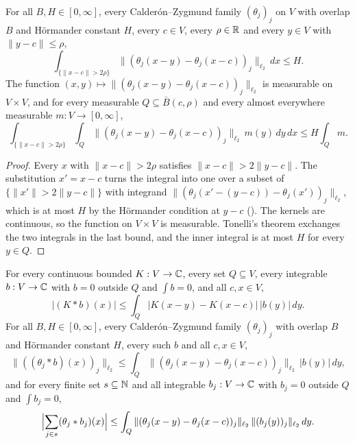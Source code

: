 \begin{lemma}
\label{lem:hormander-around-cube}
\leanok
{}
For all $B, H \in [0, \infty]$, every Calder\'on--Zygmund family $(\theta_j)_j$ on $V$ with
overlap $B$ and H\"ormander constant $H$, every $c \in V$, every $\rho \in \mathbb{R}$ and every
$y \in V$ with $\|y - c\| \leq \rho$,
\[
  \int_{\{\|x - c\| > 2\rho\}} \|(\theta_j(x - y) - \theta_j(x - c))_j\|_{\ell_2} \, dx \leq H .
\]
The function $(x, y) \mapsto \|(\theta_j(x - y) - \theta_j(x - c))_j\|_{\ell_2}$ is measurable
on $V \times V$, and for every measurable $Q \subseteq \bar B(c, \rho)$ and every almost
everywhere measurable $m : V \to [0, \infty]$,
\[
  \int_{\{\|x - c\| > 2\rho\}} \int_Q \|(\theta_j(x - y) - \theta_j(x - c))_j\|_{\ell_2} \,
  m(y) \, dy \, dx \leq H \int_Q m .
\]
\end{lemma}

\begin{proof}
\leanok
Every $x$ with $\|x - c\| > 2\rho$ satisfies $\|x - c\| > 2 \|y - c\|$. The substitution
$x' = x - c$ turns the integral into one over a subset of $\{\|x'\| > 2 \|y - c\|\}$ with
integrand $\|(\theta_j(x' - (y - c)) - \theta_j(x'))_j\|_{\ell_2}$, which is at most $H$ by the
H\"ormander condition at $y - c$ (). The kernels are continuous, so the
function on $V \times V$ is measurable. Tonelli's theorem exchanges the two integrals in the
last bound, and the inner integral is at most $H$ for every $y \in Q$.
\end{proof}

\begin{lemma}
\label{lem:mean-zero-pieces-conv}
\leanok
{}
For every continuous bounded $K : V \to \mathbb{C}$, every set $Q \subseteq V$, every integrable
$b : V \to \mathbb{C}$ with $b = 0$ outside $Q$ and $\int b = 0$, and all $c, x \in V$,
\[
  |(K * b)(x)| \leq \int_Q |K(x - y) - K(x - c)| \, |b(y)| \, dy .
\]
For all $B, H \in [0, \infty]$, every Calder\'on--Zygmund family $(\theta_j)_j$ with overlap
$B$ and H\"ormander constant $H$, every such $b$ and all $c, x \in V$,
\[
  \|((\theta_j * b)(x))_j\|_{\ell_2}
  \leq \int_Q \|(\theta_j(x - y) - \theta_j(x - c))_j\|_{\ell_2} \, |b(y)| \, dy ,
\]
and for every finite set $s \subseteq \mathbb{N}$ and all integrable $b_j : V \to \mathbb{C}$ with $b_j = 0$
outside $Q$ and $\int b_j = 0$,
\[
  \Bigl|\sum_{j \in s} (\theta_j * b_j)(x)\Bigr|
  \leq \int_Q \|(\theta_j(x - y) - \theta_j(x - c))_j\|_{\ell_2} \,
  \|(b_j(y))_j\|_{\ell_2} \, dy .
\]
\end{lemma}

